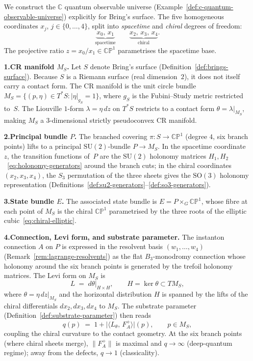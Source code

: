 \begin{remark}
\label{rem:brings-qou-4tuple}
We construct the $\mathbb{C}$ quantum observable universe
(Example~\ref{def:c-quantum-observable-universe}) explicitly for Bring's
surface.  The five homogeneous coordinates $x_j$, $j\in\{0,\dots,4\}$,
split into \emph{spacetime} and \emph{chiral} degrees of freedom:
\[
  \underbrace{x_0,\, x_1}_{\text{spacetime}}
  \qquad
  \underbrace{x_2,\, x_3,\, x_4}_{\text{chiral}}.
\]
The projective ratio $z = x_0/x_1 \in \mathbb{CP}^1$ parametrises the
spacetime base.

\medskip
\noindent\textbf{1.\;CR manifold $M_S$.}\;
Let $S$ denote Bring's surface (Definition~\ref{def:brings-surface}).
Because $S$ is a Riemann surface (real dimension~$2$), it does not itself
carry a contact form.  The CR manifold is the unit circle bundle
$M_S = \{(p,\eta) \in T^*S : \lvert\eta\rvert_{g_S} = 1\}$,
where $g_S$ is the Fubini--Study metric restricted to~$S$.  The Liouville
$1$-form $\lambda = \eta\,dz$ on $T^*S$ restricts to a contact form
$\theta = \lambda\big|_{M_S}$, making $M_S$ a $3$-dimensional strictly
pseudoconvex CR manifold.

\medskip
\noindent\textbf{2.\;Principal bundle $P$.}\;
The branched covering $\pi\colon S \to \mathbb{CP}^1$ (degree $4$, six
branch points) lifts to a principal $\mathrm{SU}(2)$-bundle
$P \to M_S$.  In the spacetime coordinate~$z$, the transition functions
of~$P$ are the $\mathrm{SU}(2)$ holonomy matrices
$H_1,H_2$~\eqref{eq:holonomy-generators} around the branch cuts; in the
chiral coordinates $(x_2,x_3,x_4)$, the $S_3$ permutation of the three
sheets gives the $\mathrm{SO}(3)$ holonomy representation
(Definitions~\ref{def:su2-generators}--\ref{def:so3-generators}).

\medskip
\noindent\textbf{3.\;State bundle $E$.}\;
The associated state bundle is $E = P \times_G \mathbb{CP}^1$,
whose fibre at each point of $M_S$ is the chiral
$\mathbb{CP}^1$ parametrised by the three roots of the elliptic
cubic~\eqref{eq:chiral-elliptic}.

\medskip
\noindent\textbf{4.\;Connection, Levi form, and substrate parameter.}\;
The instanton connection $A$ on $P$ is expressed in the resolvent basis
$(w_1,\dots,w_4)$ (Remark~\ref{rem:lagrange-resolvents}) as the flat
$B_3$-monodromy connection whose holonomy around the six branch points is
generated by the trefoil holonomy matrices.  The Levi form on $M_S$ is
\[
  L \;=\; d\theta\big|_{H \times H},
  \qquad H = \ker\theta \subset TM_S,
\]
where $\theta = \eta\,dz\big|_{M_S}$ and the horizontal distribution $H$ is
spanned by the lifts of the chiral differentials $dx_2, dx_3, dx_4$ to
$M_S$.  The substrate parameter
(Definition~\ref{def:substrate-parameter}) then reads
\[
  q(p) \;=\; 1 + \lvert\langle L_\theta,\, F_A^+ \rangle\rvert(p),
  \qquad p \in M_S,
\]
coupling the chiral curvature to the contact geometry.  At the six branch
points (where chiral sheets merge), $\lVert F_A^+\rVert$ is maximal and
$q \to \infty$ (deep-quantum regime); away from the defects,
$q \to 1$ (classicality).


\end{remark}
